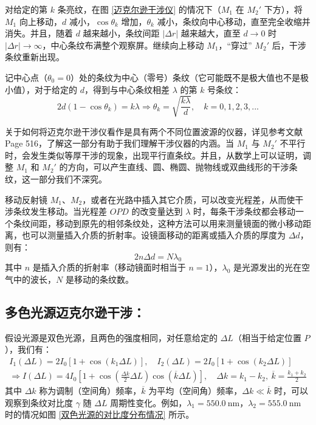 \documentclass[UTF8]{report}
\theoremstyle{MyLineTheoremStyle} %
\theoremstyle{MyBlockTheoremStyle} %
\theoremstyle{MySubsubsectionStyle} %
\begin{document}
对给定的第 $k$ 条亮纹，在图 \ref{迈克尔逊干涉仪} 的情况下（$M_1$ 在 $M_2'$ 下方），将 $M_1$ 向上移动，$d$ 减小，$\cos \theta_k$ 增加，$\theta_k$ 减小，条纹向中心移动，直至完全收缩并消失。并且，随着 $d$ 越来越小，条纹间距 $| \Delta r |$ 越来越大，直至 $d \to 0$ 时 $| \Delta r | \to \infty$，中心条纹布满整个观察屏。继续向上移动 $M_1$，“穿过” $M_2'$ 后，干涉条纹重新出现。

记中心点（$\theta_0 = 0$）处的条纹为中心（零号）条纹（它可能既不是极大值也不是极小值），对于给定的 $d$，得到与中心条纹相差 $\lambda$ 的第 $k$ 号条纹：
\begin{equation}
2d (1 - \cos \theta_k) = k \lambda \Longrightarrow \theta_k = \sqrt{\frac{k\lambda}{d}},\quad k = 0, 1, 2, 3, ... 
\end{equation}

关于如何将迈克尔逊干涉仪看作是具有两个不同位置波源的仪器，详见参考文献 \cite{Optics} Page 516，了解这一部分有助于我们理解干涉仪器的内涵。当 $M_1$ 与 $M_2'$ 不平行时，会发生类似等厚干涉的现象，出现平行直条纹。并且，从数学上可以证明，调整 $M_1$ 和 $M_2'$ 的方向，可以产生直线、圆、椭圆、抛物线或双曲线形的干涉条纹，这一部分我们不深究。

移动反射镜 $M_1$、$M_2$，或者在光路中插入其它介质，可以改变光程差，从而使干涉条纹发生移动。当光程差 $OPD$ 的改变量达到 $\lambda$ 时，每条干涉条纹都会移动一个条纹间距，移动到原先的相邻条纹处，这种方法可以用来测量镜面的微小移动距离，也可以测量插入介质的折射率。设镜面移动的距离或插入介质的厚度为 $\Delta d$，则有：
\begin{equation}
2n\Delta d = N\lambda_0
\end{equation}
其中 $n$ 是插入介质的折射率（移动镜面时相当于 $n=1$），$\lambda_0$ 是光源发出的光在空气中的波长，$N$ 是移动的条纹数。

\subsection{多色光源迈克尔逊干涉：}

假设光源是双色光源，且两色的强度相同，对任意给定的 $\Delta L$（相当于给定位置 $P$），我们有：
\begin{gather}
I_1(\Delta L) = 2I_0 \left[1 + \cos \left(k_1 \Delta L\right)\right],\quad I_2(\Delta L) = 2I_0 \left[1 + \cos \left(k_2 \Delta L\right)\right] \\ 
\Longrightarrow I(\Delta L) = 4 I_0 \left[ 1 + \cos \left(\frac{\Delta k}{2}\Delta L\right)\cos(\overline{k} \Delta L) \right],\quad \Delta k = k_1 - k_2,\ \overline{k} = \frac{k_1 + k_2}{2}
\end{gather}
其中 $\Delta k$ 称为调制（空间角）频率，$\overline{k}$ 为平均（空间角）频率，$\Delta k \ll \overline{k}$ 时，可以观察到条纹对比度 $\gamma$ 随 $\Delta L$ 周期性变化。例如，$\lambda_1 = 550.0\ \mathrm{nm}$，$\lambda_2 = 555.0\ \mathrm{nm}$ 时的情况如图 \ref{双色光源的对比度分布情况} 所示。
\end{document}
